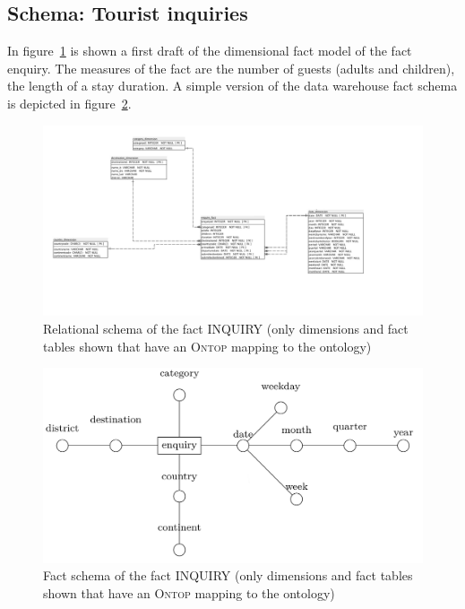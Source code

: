 \subsection{Schema: Tourist inquiries}
\label{chapter:schema}

In figure~\ref{fig:schema_fact_inquiry} is shown a first draft of the dimensional fact model of the fact enquiry.
The measures of the fact are the number of guests (adults and children), the
length of a stay duration. A simple version of the data warehouse fact schema is depicted in figure~\ref{fig:fact_schema}.

\begin{figure}
	\centering
	\includegraphics[scale=0.5,width=\textwidth]{img/schema_fact_inquiry.jpg}
	\caption{Relational schema of the fact INQUIRY (only dimensions and fact tables shown that have an \textsc{Ontop} mapping to the ontology)}
	\label{fig:schema_fact_inquiry}
\end{figure}

\begin{figure}
	\centering
	\includegraphics[scale=0.35,width=\textwidth]{img/fact_schema.jpg}
	\caption{Fact schema of the fact INQUIRY (only dimensions and fact tables shown that have an \textsc{Ontop} mapping to the ontology)}
	\label{fig:fact_schema}
\end{figure}
